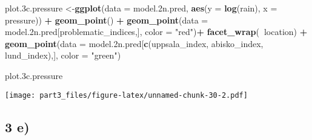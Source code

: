 \documentclass[]{article}
\newenvironment{Shaded}{\begin{snugshade}}{\end{snugshade}}
\newcommand{\DataTypeTok}[1]{\textcolor[rgb]{0.13,0.29,0.53}{#1}}
\newcommand{\FloatTok}[1]{\textcolor[rgb]{0.00,0.00,0.81}{#1}}
\newcommand{\KeywordTok}[1]{\textcolor[rgb]{0.13,0.29,0.53}{\textbf{#1}}}
\newcommand{\NormalTok}[1]{#1}
\newcommand{\OperatorTok}[1]{\textcolor[rgb]{0.81,0.36,0.00}{\textbf{#1}}}
\newcommand{\StringTok}[1]{\textcolor[rgb]{0.31,0.60,0.02}{#1}}
\begin{document}
\begin{Shaded}
\begin{Highlighting}[]
\NormalTok{plot}\FloatTok{.3}\NormalTok{c.pressure <-}\KeywordTok{ggplot}\NormalTok{(}\DataTypeTok{data =}\NormalTok{ model}\FloatTok{.2}\NormalTok{n.pred, }\KeywordTok{aes}\NormalTok{(}\DataTypeTok{y =} \KeywordTok{log}\NormalTok{(rain), }\DataTypeTok{x =}\NormalTok{ pressure)) }\OperatorTok{+}\StringTok{ }
\StringTok{  }\KeywordTok{geom_point}\NormalTok{() }\OperatorTok{+}\StringTok{ }
\StringTok{  }\KeywordTok{geom_point}\NormalTok{(}\DataTypeTok{data =}\NormalTok{ model}\FloatTok{.2}\NormalTok{n.pred[problematic_indices,], }\DataTypeTok{color =} \StringTok{"red"}\NormalTok{)}\OperatorTok{+}
\StringTok{  }\KeywordTok{facet_wrap}\NormalTok{(}\OperatorTok{~}\NormalTok{location) }\OperatorTok{+}\StringTok{ }
\StringTok{  }\KeywordTok{geom_point}\NormalTok{(}\DataTypeTok{data =}\NormalTok{ model}\FloatTok{.2}\NormalTok{n.pred[}\KeywordTok{c}\NormalTok{(uppsala_index, abisko_index, lund_index),], }\DataTypeTok{color =} \StringTok{"green"}\NormalTok{)}

\NormalTok{plot}\FloatTok{.3}\NormalTok{c.pressure}
\end{Highlighting}
\end{Shaded}

\texttt{[image: part3\_files/figure-latex/unnamed-chunk-30-2.pdf]}

\hypertarget{e}{%
\subsection{3 e)}\label{e}}

\begin{Shaded}
\end{Shaded}
\end{document}
